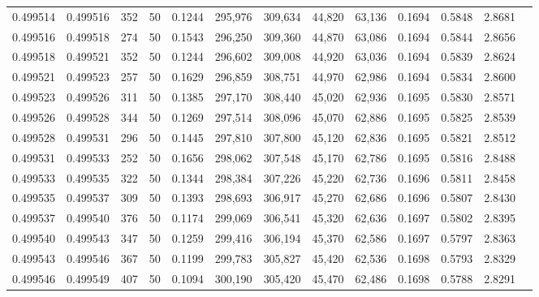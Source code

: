 \begin{tabular}{rrrrrrrrrrrrr}
0.499514 & 0.499516 & 352 &  50 &                                     0.1244 & 295,976 & 309,634 &  44,820 &  63,136 & 0.1694 & 0.5848 & 2.8681 \\
0.499516 & 0.499518 & 274 &  50 &                                     0.1543 & 296,250 & 309,360 &  44,870 &  63,086 & 0.1694 & 0.5844 & 2.8656 \\
0.499518 & 0.499521 & 352 &  50 &                                     0.1244 & 296,602 & 309,008 &  44,920 &  63,036 & 0.1694 & 0.5839 & 2.8624 \\
0.499521 & 0.499523 & 257 &  50 &                                     0.1629 & 296,859 & 308,751 &  44,970 &  62,986 & 0.1694 & 0.5834 & 2.8600 \\
0.499523 & 0.499526 & 311 &  50 &                                     0.1385 & 297,170 & 308,440 &  45,020 &  62,936 & 0.1695 & 0.5830 & 2.8571 \\
0.499526 & 0.499528 & 344 &  50 &                                     0.1269 & 297,514 & 308,096 &  45,070 &  62,886 & 0.1695 & 0.5825 & 2.8539 \\
0.499528 & 0.499531 & 296 &  50 &                                     0.1445 & 297,810 & 307,800 &  45,120 &  62,836 & 0.1695 & 0.5821 & 2.8512 \\
0.499531 & 0.499533 & 252 &  50 &                                     0.1656 & 298,062 & 307,548 &  45,170 &  62,786 & 0.1695 & 0.5816 & 2.8488 \\
0.499533 & 0.499535 & 322 &  50 &                                     0.1344 & 298,384 & 307,226 &  45,220 &  62,736 & 0.1696 & 0.5811 & 2.8458 \\
0.499535 & 0.499537 & 309 &  50 &                                     0.1393 & 298,693 & 306,917 &  45,270 &  62,686 & 0.1696 & 0.5807 & 2.8430 \\
0.499537 & 0.499540 & 376 &  50 &                                     0.1174 & 299,069 & 306,541 &  45,320 &  62,636 & 0.1697 & 0.5802 & 2.8395 \\
0.499540 & 0.499543 & 347 &  50 &                                     0.1259 & 299,416 & 306,194 &  45,370 &  62,586 & 0.1697 & 0.5797 & 2.8363 \\
0.499543 & 0.499546 & 367 &  50 &                                     0.1199 & 299,783 & 305,827 &  45,420 &  62,536 & 0.1698 & 0.5793 & 2.8329 \\
0.499546 & 0.499549 & 407 &  50 &                                     0.1094 & 300,190 & 305,420 &  45,470 &  62,486 & 0.1698 & 0.5788 & 2.8291 \\

\end{tabular}
